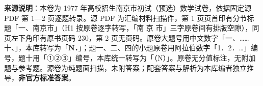 


\begin{gktip}
\textbf{来源说明}：本卷为 1977 年高校招生南京市初试（预选）数学试卷，依据固定源 PDF 第 1—2 页逐题转录。源 PDF 为汇编材料扫描件，第 1 页页首印有分节标题「一、南京市」（H1 按原卷逐字转写，「南 京 市」三字原卷间有排版空隙），同页左下角印有原书页码 230，第 2 页无页码。原卷大题号用中文数字「一、……十、」，本库转写为「\textbf{N．}」；题一、二、四的小题原卷用阿拉伯数字「1．2．…」编号，题十用「①②③」编号，本库统一转写为「（N）」。原卷无分值标注，无附加题与参考题。源卷为纯题面扫描，未附答案；配套答案与解析为本库编者独立推导，\textbf{非官方标准答案}。
\end{gktip}

\par\medskip

